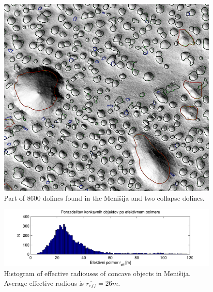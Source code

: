 \documentclass[a0,portrait]{a0poster}
\begin{document}
\begin{multicols}{2}
	\begin{minipage}[b]{0.5\textwidth}
      \begin{minipage}{0.2\linewidth}
          \begin{figure}[H]
              \includegraphics[width=\textwidth]{menisija-vrtace}
              \caption{Part of 8600 dolines found in the Menišija and two collapse dolines.}
              \label{fig:vrtaceinpolmeri}
          \end{figure}
      \end{minipage}
      \begin{minipage}{0.83\linewidth}
          \begin{figure}[H]
              \includegraphics[width=\textwidth]{menisija-polmeri-hist}
              \caption{Histogram of effective radiouses of concave objects in Menišija. \\Average effective radious is $\overline{r_{eff}} = 26m$.}
              \label{fig:vrtave-histogram}
          \end{figure}
      \end{minipage}
	\end{minipage}


\end{multicols}
\end{document}
